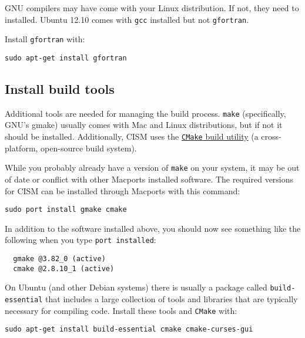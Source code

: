 \begin{mdframed}[style=ubuntu] %
GNU compilers may have come with your Linux distribution.  If not, they need to 
installed.  Ubuntu 12.10 comes with \texttt{gcc} installed but not \texttt{gfortran}.

Install \texttt{gfortran} with:

\texttt{sudo apt-get install gfortran}

\end{mdframed}                 %


\subsection{Install build tools}

Additional tools are needed for managing the build process.  \texttt{make} (specifically, GNU's gmake)
usually comes with Mac and Linux distributions, but if not it should be installed.  
Additionally, CISM uses the \href{http://www.cmake.org/}{\texttt{CMake} build utility}
(a cross-platform, open-source build system).

\begin{mdframed}[style=mac] %

While you probably already have a version of \texttt{make} on your system, it may be out of date or conflict with other Macports installed software. The required versions for CISM can be installed through Macports with this command: 

\begin{verbatim}
sudo port install gmake cmake
\end{verbatim}

In addition to the software installed above, you should now see something like the following when you type \texttt{port installed}:

\begin{verbatim}
  gmake @3.82_0 (active)
  cmake @2.8.10_1 (active)
\end{verbatim}
\end{mdframed}              %



\begin{mdframed}[style=ubuntu] %

On Ubuntu (and other Debian systems) there is usually a package called \texttt{build-essential} 
that includes a large collection of tools and libraries that are typically necessary
for compiling code. Install these tools and \texttt{CMake} with:

\texttt{sudo apt-get install build-essential cmake cmake-curses-gui}
\end{mdframed}                 %


